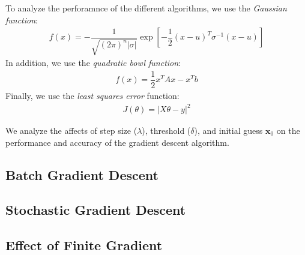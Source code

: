 \documentclass[letterpaper, twocolumn,10pt]{article}
\begin{document}
To analyze the perforamnce of the different algorithms, we use the \emph{Gaussian function}:
\begin{align*}
f(x) = - \dfrac{1}{\sqrt{(2\pi)^n |\sigma|}} \exp \left[-\dfrac{1}{2} (x - u)^T \sigma^{-1} (x-u)\right]
\end{align*}
In addition, we use the \emph{quadratic bowl function}:
\begin{align*}
f(x) = \dfrac{1}{2} x^T A x - x^T b 
\end{align*}
Finally, we use the \emph{least squares error} function:
\begin{align*}
J(\theta) = |X\theta - y|^2
\end{align*}

We analyze the affects of step size ($\lambda$), threshold ($\delta$), and initial guess $\mathbf{x}_{0}$ on the performance and accuracy of the gradient descent algorithm.

\subsection{Batch Gradient Descent}


\subsection{Stochastic Gradient Descent}
\subsection{Effect of Finite Gradient}
\end{document}
